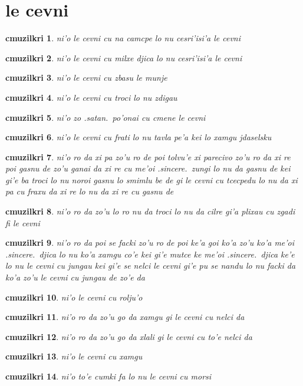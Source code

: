 \documentclass{report}
\newtheorem{cmuzilkri}{cmuzilkri}
\begin{document}
\section{le cevni}
\begin{cmuzilkri}
	ni'o le cevni cu na camcpe lo nu cesri'isi'a le cevni
\end{cmuzilkri}
\begin{cmuzilkri}
	ni'o le cevni cu milxe djica lo nu cesri'isi'a le cevni
\end{cmuzilkri}
\begin{cmuzilkri}
	ni'o le cevni cu zbasu le munje
\end{cmuzilkri}
\begin{cmuzilkri}
	ni'o le cevni cu troci lo nu zdigau
\end{cmuzilkri}
\begin{cmuzilkri}
	ni'o zo .satan.\ po'onai cu cmene le cevni
\end{cmuzilkri}
\begin{cmuzilkri}
	ni'o le cevni cu frati lo nu tavla pe'a kei lo xamgu jdaselsku
\end{cmuzilkri}
\begin{cmuzilkri}
	ni'o ro da xi pa zo'u ro de poi tolvu'e xi parecivo zo'u ro da xi re poi gasnu de zo'u ganai da xi re cu me'oi .sincere.\ zungi lo nu da gasnu de kei gi'e ba troci lo nu noroi gasnu lo smimlu be de gi le cevni cu tcecpedu lo nu da xi pa cu fraxu da xi re lo nu da xi re cu gasnu de
\end{cmuzilkri}
\begin{cmuzilkri}
	ni'o ro da zo'u lo ro nu da troci lo nu da cilre gi'a plixau cu zgadi fi le cevni
\end{cmuzilkri}
\begin{cmuzilkri}
	ni'o ro da poi se facki zo'u ro de poi ke'a goi ko'a zo'u ko'a me'oi .sincere.\ djica lo nu ko'a xamgu co'e kei gi'e mutce ke me'oi .sincere.\ djica ke'e lo nu le cevni cu jungau kei gi'e se nelci le cevni gi'e pu se nandu lo nu facki da ko'a zo'u le cevni cu jungau de zo'e da
\end{cmuzilkri}
\begin{cmuzilkri}
	ni'o le cevni cu rolju'o
\end{cmuzilkri}
\begin{cmuzilkri}
	ni'o ro da zo'u go da xamgu gi le cevni cu nelci da
\end{cmuzilkri}
\begin{cmuzilkri}
	ni'o ro da zo'u go da xlali gi le cevni cu to'e nelci da
\end{cmuzilkri}
\begin{cmuzilkri}
	ni'o le cevni cu xamgu
\end{cmuzilkri}
\begin{cmuzilkri}
	ni'o to'e cumki fa lo nu le cevni cu morsi
\end{cmuzilkri}
\end{document}

